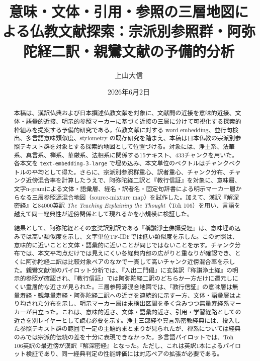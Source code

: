 \documentclass[uplatex,dvipdfmx,11pt,a4paper]{jsarticle}
\title{意味・文体・引用・参照の三層地図による仏教文献探索：宗派別参照群・阿弥陀経二訳・親鸞文献の予備的分析}
\author{上山大信}
\date{2026年6月2日}
\begin{document}
\maketitle

\begin{abstract}
本稿は、漢訳仏典および日本撰述仏教文献を対象に、文献間の近接を意味的近接、文体・語彙的近接、明示的参照マーカーに基づく近接の三層に分けて可視化する探索的枠組みを提案する予備的研究である。仏教文献に対する word embedding、並行句検出、多言語意味類似度、stylometry の既存研究を踏まえ、本稿は日本仏教の宗派別参照テキスト群を対象とする探索的地図として位置づける。対象には、浄土系、法華系、真言系、禅系、華厳系、法相系に関係する15テキスト、433チャンクを用いた。各本文を \texttt{text-embedding-3-large} で埋め込み、本文単位のベクトルはチャンクベクトルの平均として得た。さらに、宗派別参照群重心、訳者重心、チャンク分布、チャンク近傍混合率を計算したうえで、阿弥陀経二訳と『教行信証』を対象に、意味層、文字n-gramによる文体・語彙層、経名・訳者名・固定句辞書による明示マーカー層からなる三層参照源混合地図（source-mixture map）を試作した。加えて、漢訳『解深密経』と84000英訳 \textit{The Teaching Explaining the Thought}（Toh 106）を用い、言語を越えて同一経典性が近傍関係として現れるかを小規模に検証した。

結果として、阿弥陀経とその玄奘訳別訳である『稱讃淨土佛攝受經』は、意味埋め込みでは高い類似度を示し、文字単位TF-IDFでは低い類似度を示した。この対照は、意味的に近いことと文体・語彙的に近いことが同じではないことを示す。チャンク分布では、本文平均点だけでは見えにくい各経典内部の広がりと重なりが確認でき、とくに阿弥陀経二訳は比較対象ペアのなかで一貫して高いチャンク近傍混合率を示した。親鸞文献側のパイロット分析では、『入出二門偈』に玄奘訳『称讃浄土経』の明示的参照が確認され、『教行信証』では阿弥陀経二訳のどちらか一方だけに還元しにくい重層的な近さが見られた。三層参照源混合地図では、『教行信証』の意味層は無量寿経・観無量寿経・阿弥陀経二訳への近さを連続的に示す一方、文体・語彙層はより均された分布を示し、明示マーカー層は未検出区間を多く含みつつ無量寿経系マーカーが目立った。これは、意味的近さ、文体・語彙的近さ、引用・学習経路としての近さを別レイヤーとして読む必要を示す。浄土三部経や真言系密教経典には、投入した参照テキスト群の範囲で一定の主題的まとまりが見られたが、禅系については経典のみでは宗派的伝統の差を十分に表現できなかった。多言語パイロットでは、Toh 106英訳の最近傍が漢訳『解深密経』となった。ただし、これは英訳1本によるパイロット検証であり、同一経典判定の性能評価には対応ペアの拡張が必要である。
\end{abstract}
\end{document}
